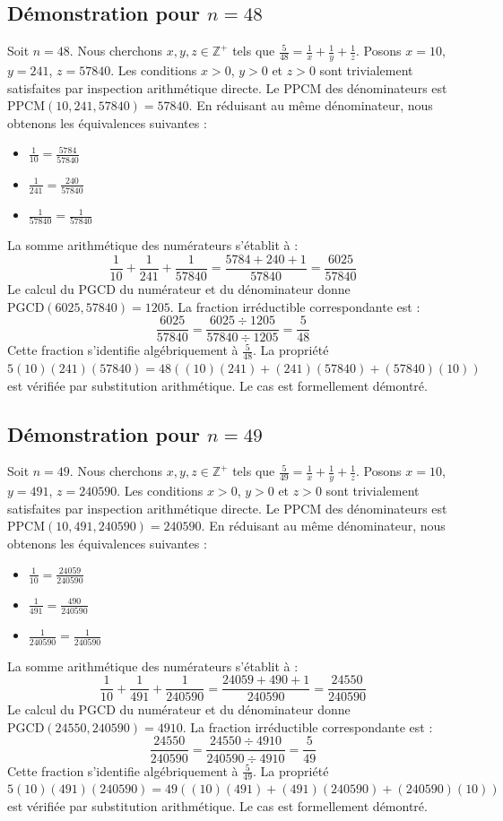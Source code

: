 \documentclass[12pt,a4paper]{article}
\begin{document}
\subsection{Démonstration pour $n = 48$}
Soit $n = 48$. Nous cherchons $x, y, z \in \mathbb{Z}^{+}$ tels que $\frac{5}{48} = \frac{1}{x} + \frac{1}{y} + \frac{1}{z}$.
Posons $x = 10$, $y = 241$, $z = 57840$.
Les conditions $x > 0$, $y > 0$ et $z > 0$ sont trivialement satisfaites par inspection arithmétique directe.
Le PPCM des dénominateurs est $\text{PPCM}(10, 241, 57840) = 57840$.
En réduisant au même dénominateur, nous obtenons les équivalences suivantes :
\begin{itemize}
    \item $\frac{1}{10} = \frac{5784}{57840}$
    \item $\frac{1}{241} = \frac{240}{57840}$
    \item $\frac{1}{57840} = \frac{1}{57840}$
\end{itemize}
La somme arithmétique des numérateurs s'établit à :
$$ \frac{1}{10} + \frac{1}{241} + \frac{1}{57840} = \frac{5784 + 240 + 1}{57840} = \frac{6025}{57840} $$
Le calcul du PGCD du numérateur et du dénominateur donne $\text{PGCD}(6025, 57840) = 1205$.
La fraction irréductible correspondante est :
$$ \frac{6025}{57840} = \frac{6025 \div 1205}{57840 \div 1205} = \frac{5}{48} $$
Cette fraction s'identifie algébriquement à $\frac{5}{48}$.
La propriété $5(10)(241)(57840) = 48((10)(241) + (241)(57840) + (57840)(10))$ est vérifiée par substitution arithmétique.
Le cas est formellement démontré.

\subsection{Démonstration pour $n = 49$}
Soit $n = 49$. Nous cherchons $x, y, z \in \mathbb{Z}^{+}$ tels que $\frac{5}{49} = \frac{1}{x} + \frac{1}{y} + \frac{1}{z}$.
Posons $x = 10$, $y = 491$, $z = 240590$.
Les conditions $x > 0$, $y > 0$ et $z > 0$ sont trivialement satisfaites par inspection arithmétique directe.
Le PPCM des dénominateurs est $\text{PPCM}(10, 491, 240590) = 240590$.
En réduisant au même dénominateur, nous obtenons les équivalences suivantes :
\begin{itemize}
    \item $\frac{1}{10} = \frac{24059}{240590}$
    \item $\frac{1}{491} = \frac{490}{240590}$
    \item $\frac{1}{240590} = \frac{1}{240590}$
\end{itemize}
La somme arithmétique des numérateurs s'établit à :
$$ \frac{1}{10} + \frac{1}{491} + \frac{1}{240590} = \frac{24059 + 490 + 1}{240590} = \frac{24550}{240590} $$
Le calcul du PGCD du numérateur et du dénominateur donne $\text{PGCD}(24550, 240590) = 4910$.
La fraction irréductible correspondante est :
$$ \frac{24550}{240590} = \frac{24550 \div 4910}{240590 \div 4910} = \frac{5}{49} $$
Cette fraction s'identifie algébriquement à $\frac{5}{49}$.
La propriété $5(10)(491)(240590) = 49((10)(491) + (491)(240590) + (240590)(10))$ est vérifiée par substitution arithmétique.
Le cas est formellement démontré.
\end{document}
